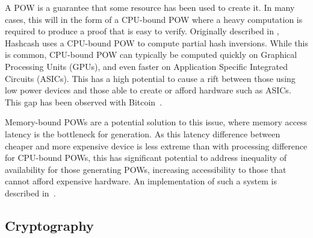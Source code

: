 			A POW is a guarantee that some resource has been used to create it. In many cases, this will in the form of a CPU-bound POW where a heavy computation is required to produce a proof that is easy to verify. Originally described in \cite{back2002hashcash}, Hashcash uses a CPU-bound POW to compute partial hash inversions. While this is common, CPU-bound POW can typically be computed quickly on Graphical Processing Units (GPUs), and even faster on Application Specific Integrated Circuits (ASICs). This has a high potential to cause a rift between those using low power devices and those able to create or afford hardware such as ASICs. This gap has been observed with Bitcoin~\cite{peck2013bitcoin}.
			
			Memory-bound POWs are a potential solution to this issue, where memory access latency is the bottleneck for generation. As this latency difference between cheaper and more expensive device is less extreme than with processing difference for CPU-bound POWs, this has significant potential to address inequality of availability for those generating POWs, increasing accessibility to those that cannot afford expensive hardware. An implementation of such a system is described in~\cite{cuckoo}.
	\subsection{Cryptography}
